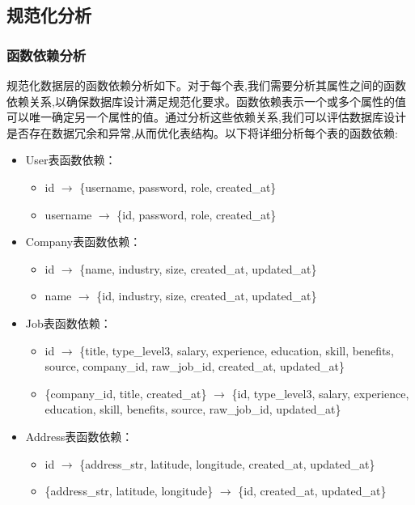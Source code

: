 \subsection{规范化分析}

\subsubsection{函数依赖分析}

规范化数据层的函数依赖分析如下。对于每个表,我们需要分析其属性之间的函数依赖关系,以确保数据库设计满足规范化要求。函数依赖表示一个或多个属性的值可以唯一确定另一个属性的值。通过分析这些依赖关系,我们可以评估数据库设计是否存在数据冗余和异常,从而优化表结构。以下将详细分析每个表的函数依赖:

\begin{itemize}
    \item User表函数依赖：
    \begin{itemize}
        \item id $\rightarrow$ \{username, password, role, created\_at\}
        \item username $\rightarrow$ \{id, password, role, created\_at\}
    \end{itemize}
    \item Company表函数依赖：
    \begin{itemize}
        \item id $\rightarrow$ \{name, industry, size, created\_at, updated\_at\}
        \item name $\rightarrow$ \{id, industry, size, created\_at, updated\_at\}
    \end{itemize}
    \item Job表函数依赖：
    \begin{itemize}
        \item id $\rightarrow$ \{title, type\_level3, salary, experience, education, skill, benefits, source, company\_id, raw\_job\_id, created\_at, updated\_at\}
        \item \{company\_id, title, created\_at\} $\rightarrow$ \{id, type\_level3, salary, experience, education, skill, benefits, source, raw\_job\_id, updated\_at\}
    \end{itemize}
    \item Address表函数依赖：
    \begin{itemize}
        \item id $\rightarrow$ \{address\_str, latitude, longitude, created\_at, updated\_at\}
        \item \{address\_str, latitude, longitude\} $\rightarrow$ \{id, created\_at, updated\_at\}
    \end{itemize}
\end{itemize}

